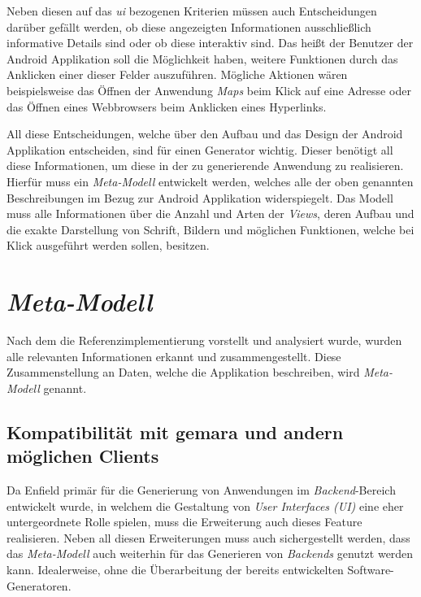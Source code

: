 Neben diesen auf das \textit{\acf{ui}} bezogenen Kriterien müssen auch Entscheidungen darüber gefällt werden, ob diese angezeigten Informationen ausschließlich informative Details sind oder ob diese interaktiv sind. Das heißt der Benutzer der Android Applikation soll die Möglichkeit haben, weitere Funktionen durch das Anklicken einer dieser Felder auszuführen. Mögliche Aktionen wären beispielsweise das Öffnen der Anwendung \textit{Maps} beim Klick auf eine Adresse oder das Öffnen eines Webbrowsers beim Anklicken eines Hyperlinks. 

All diese Entscheidungen, welche über den Aufbau und das Design der Android Applikation entscheiden, sind für einen Generator wichtig. Dieser benötigt all diese Informationen, um diese in der zu generierende Anwendung zu realisieren. Hierfür muss ein \textit{Meta-Modell} entwickelt werden, welches alle der oben genannten Beschreibungen im Bezug zur Android Applikation widerspiegelt. Das Modell muss alle Informationen über die Anzahl und Arten der \textit{Views}, deren Aufbau und die exakte Darstellung von Schrift, Bildern und möglichen Funktionen, welche bei Klick ausgeführt werden sollen, besitzen.

\section{\textit{Meta-Modell}}
Nach dem die Referenzimplementierung vorstellt und analysiert  wurde, wurden alle relevanten Informationen erkannt und zusammengestellt. Diese Zusammenstellung an Daten, welche die Applikation beschreiben, wird \textit{Meta-Modell} genannt.

\subsection{Kompatibilität mit \acs{gemara} und andern möglichen Clients}
Da Enfield primär für die Generierung von Anwendungen im \textit{Backend}-Bereich entwickelt wurde, in welchem die Gestaltung von \textit{User Interfaces (UI)} eine eher untergeordnete Rolle spielen, muss die Erweiterung auch dieses Feature realisieren. Neben all diesen Erweiterungen muss auch sichergestellt werden, dass das \textit{Meta-Modell} auch weiterhin für das Generieren von \textit{Backends} genutzt werden kann. Idealerweise, ohne die Überarbeitung der bereits entwickelten Software-Generatoren. 

